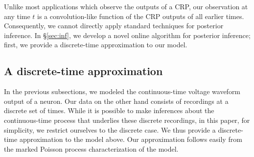 Unlike most applications which observe the outputs of a CRP, our observation at any time $t$ is a convolution-like function of the CRP outputs of all
earlier times. Consequently, we cannot directly apply standard techniques for posterior inference. In \S \ref{sec:inf}, we develop a novel online 
algorithm for posterior inference; first, we provide a discrete-time approximation to our model.


\vspace{-.1in}
\subsection{A discrete-time approximation}
In the previous subsections, we modeled the continuous-time voltage waveform output of a neuron. Our data on the other hand consists of recordings
at a discrete set of times. While it is possible to make inferences about the continuous-time process that underlies these discrete recordings,
in this paper, for simplicity, we restrict ourselves to the discrete case. We thus provide a discrete-time approximation to the model above. 
Our approximation follows easily from the marked Poisson process characterization of the model.

